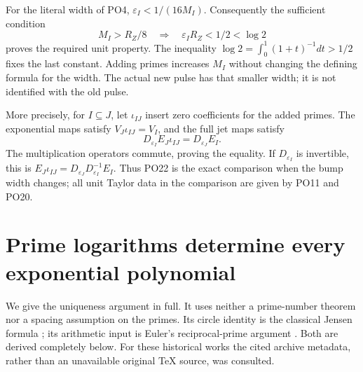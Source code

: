 \documentclass[11pt]{article}
\newcommand{\eps}{\varepsilon}
\begin{document}
For the literal width of PO4,
\(\eps_I<1/(16M_I)\). Consequently the sufficient condition
\[
 M_I>R_Z/8
 \quad\Longrightarrow\quad
 \eps_I R_Z<1/2<\log2
 \tag{PO21}\label{po:width}
\]
proves the required unit property. The inequality
\(\log2=\int_0^1(1+t)^{-1}dt>1/2\) fixes the last constant.
Adding primes increases \(M_I\) without changing the defining
formula for the width. The actual new pulse has that smaller
width; it is not identified with the old pulse.

More precisely, for \(I\subseteq J\), let
\(\iota_{IJ}\) insert zero coefficients for the added primes.
The exponential maps satisfy \(V_J\iota_{IJ}=V_I\), and the
full jet maps satisfy
\[
 D_{\eps_I}E_J\iota_{IJ}=D_{\eps_J}E_I.
 \tag{PO22}\label{po:width-change}
\]
The multiplication operators commute, proving the equality.
If \(D_{\eps_I}\) is invertible, this is
\(E_J\iota_{IJ}=D_{\eps_J}D_{\eps_I}^{-1}E_I\).
Thus PO22 is the exact comparison when the bump width changes;
all unit Taylor data in the comparison are given by PO11 and PO20.

\section{Prime logarithms determine every exponential polynomial}

We give the uniqueness argument in full. It uses neither a
prime-number theorem nor a spacing assumption on the primes.
Its circle identity is the classical Jensen formula
\cite{Jensen}; its arithmetic input is Euler's reciprocal-prime
argument \cite{Euler}. Both are derived completely below.
For these historical works the cited archive metadata, rather
than an unavailable original TeX source, was consulted.
\end{document}
